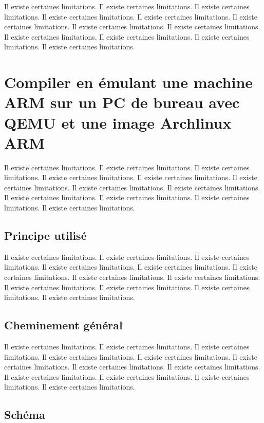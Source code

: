 \documentclass[11pt,a4paper,oneside]{report}
\begin{document}
Il existe certaines limitations.
Il existe certaines limitations.
Il existe certaines limitations.
Il existe certaines limitations.
Il existe certaines limitations.
Il existe certaines limitations.
Il existe certaines limitations.
Il existe certaines limitations.
Il existe certaines limitations.
Il existe certaines limitations.
Il existe certaines limitations.
Il existe certaines limitations.


\section{Compiler en émulant une machine ARM sur un PC de bureau avec QEMU et une image Archlinux ARM}

Il existe certaines limitations.
Il existe certaines limitations.
Il existe certaines limitations.
Il existe certaines limitations.
Il existe certaines limitations.
Il existe certaines limitations.
Il existe certaines limitations.
Il existe certaines limitations.
Il existe certaines limitations.
Il existe certaines limitations.
Il existe certaines limitations.
Il existe certaines limitations.
\subsection{Principe utilisé}

Il existe certaines limitations.
Il existe certaines limitations.
Il existe certaines limitations.
Il existe certaines limitations.
Il existe certaines limitations.
Il existe certaines limitations.
Il existe certaines limitations.
Il existe certaines limitations.
Il existe certaines limitations.
Il existe certaines limitations.
Il existe certaines limitations.
Il existe certaines limitations.

\subsection{Cheminement général}

Il existe certaines limitations.
Il existe certaines limitations.
Il existe certaines limitations.
Il existe certaines limitations.
Il existe certaines limitations.
Il existe certaines limitations.
Il existe certaines limitations.
Il existe certaines limitations.
Il existe certaines limitations.
Il existe certaines limitations.
Il existe certaines limitations.
Il existe certaines limitations.
\subsection{Schéma}
\end{document}
